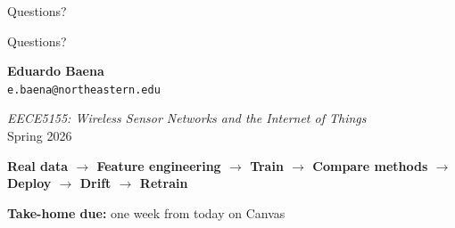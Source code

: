 \documentclass[aspectratio=169,11pt]{beamer}
\begin{document}
\begin{frame}{Questions?}
    \begin{center}
        \Huge Questions?

        \vspace{0.8cm}
        \normalsize
        \textbf{Eduardo Baena}\\
        \texttt{e.baena@northeastern.edu}

        \vspace{0.5cm}
        \textit{EECE5155: Wireless Sensor Networks and the Internet of Things}\\
        Spring 2026

        \vspace{0.4cm}
        \textbf{Real data $\rightarrow$ Feature engineering $\rightarrow$ Train $\rightarrow$ Compare methods $\rightarrow$ Deploy $\rightarrow$ Drift $\rightarrow$ Retrain}

        \vspace{0.3cm}
        {\small \textbf{Take-home due:} one week from today on Canvas}
    \end{center}
\end{frame}
\end{document}
